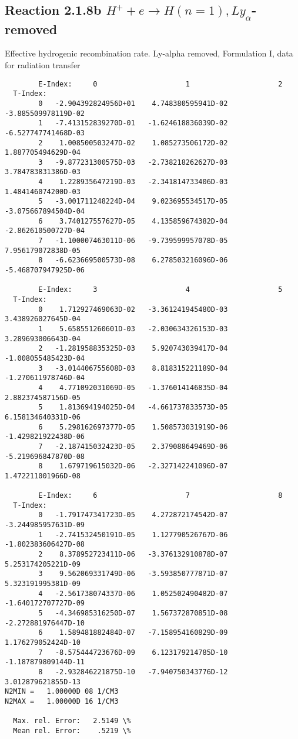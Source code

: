 \documentclass[12pt,dvipdfmx]{article}
\begin{document}
\subsection{
Reaction 2.1.8b  $H^+ + e \rightarrow H(n=1), Ly_\alpha$-removed
}


   Effective hydrogenic recombination rate.
   Ly-alpha removed, Formulation I, data for radiation transfer

\begin{small}\begin{verbatim}
        E-Index:     0                     1                     2
  T-Index:
        0   -2.904392824956D+01    4.748380595941D-02   -3.885509978119D-02
        1   -7.413152839270D-01   -1.624618836039D-02   -6.527747741468D-03
        2    1.008500503247D-02    1.085273506172D-02    1.887705494629D-04
        3   -9.877231300575D-03   -2.738218262627D-03    3.784783831386D-03
        4    1.228935647219D-03   -2.341814733406D-03    1.484146074200D-03
        5   -3.001711248224D-04    9.023695534517D-05   -3.075667894504D-04
        6    3.740127557627D-05    4.135859674382D-04   -2.862610500727D-04
        7   -1.100007463011D-06   -9.739599957078D-05    7.956179072838D-05
        8   -6.623669500573D-08    6.278503216096D-06   -5.468707947925D-06

        E-Index:     3                     4                     5
  T-Index:
        0    1.712927469063D-02   -3.361241945480D-03    3.438926027645D-04
        1    5.658551260601D-03   -2.030634326153D-03    3.289693006643D-04
        2   -1.281958835325D-03    5.920743039417D-04   -1.008055485423D-04
        3   -3.014406755608D-03    8.818315221189D-04   -1.270611978746D-04
        4    4.771092031069D-05   -1.376014146835D-04    2.882374587156D-05
        5    1.813694194025D-04   -4.661737833573D-05    6.158134640331D-06
        6    5.298162697377D-05    1.508573031919D-06   -1.429821922438D-06
        7   -2.187415032423D-05    2.379088649469D-06   -5.219696847870D-08
        8    1.679719615032D-06   -2.327142241096D-07    1.472211001966D-08

        E-Index:     6                     7                     8
  T-Index:
        0   -1.791747341723D-05    4.272872174542D-07   -3.244985957631D-09
        1   -2.741532450191D-05    1.127790526767D-06   -1.802383606427D-08
        2    8.378952723411D-06   -3.376132910878D-07    5.253174205221D-09
        3    9.562069331749D-06   -3.593850777871D-07    5.323191995381D-09
        4   -2.561738074337D-06    1.052502490482D-07   -1.640172707727D-09
        5   -4.346985316250D-07    1.567372870851D-08   -2.272881976447D-10
        6    1.589481882484D-07   -7.158954160829D-09    1.176279052424D-10
        7   -8.575444723676D-09    6.123179214785D-10   -1.187879809144D-11
        8   -2.932846221875D-10   -7.940750343776D-12    3.012879621855D-13
N2MIN =   1.00000D 08 1/CM3
N2MAX =   1.00000D 16 1/CM3

  Max. rel. Error:   2.5149 \%
  Mean rel. Error:    .5219 \%



\end{verbatim}\end{small}
\end{document}
